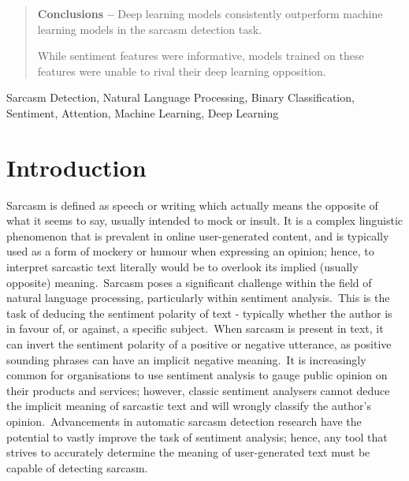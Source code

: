 \documentclass[12pt,a4paper]{article}
\begin{document}
\begin{abstract}
\noindent \textbf{Conclusions --} Deep learning models consistently outperform machine learning models in the sarcasm detection task. %

While sentiment features were informative, models trained on these features were unable to rival their deep learning opposition.

\end{abstract}\vspace{-10pt}

\begin{keywords}
Sarcasm Detection, Natural Language Processing, Binary Classification, Sentiment, Attention, Machine Learning, Deep Learning
\end{keywords}\vspace{-8pt}

\section{Introduction}\vspace{-4.2pt}
\noindent Sarcasm is defined as speech or writing which actually means the opposite of what it seems to say, usually intended to mock or insult\footnotemark[1]. It is a complex linguistic phenomenon that is prevalent in online user-generated content, and is typically used as a form of mockery or humour when expressing an opinion; hence, to interpret sarcastic text literally would be to overlook its implied (usually opposite) meaning.\ Sarcasm poses a significant challenge within the field of natural language processing, particularly within sentiment analysis.\ This is the task of deducing the sentiment polarity of text - typically whether the author is in favour of, or against, a specific subject.\ When sarcasm is present in text, it can invert the sentiment polarity of a positive or negative utterance, as positive sounding phrases can have an implicit negative meaning.\ It is increasingly common for organisations to use sentiment analysis to gauge public opinion on their products and services; however, classic sentiment analysers cannot deduce the implicit meaning of sarcastic text and will wrongly classify the author's opinion.\ Advancements in automatic sarcasm detection research have the potential to vastly improve the task of sentiment analysis; hence, any tool that strives to accurately determine the meaning of user-generated text must be capable of detecting sarcasm.
\end{document}
